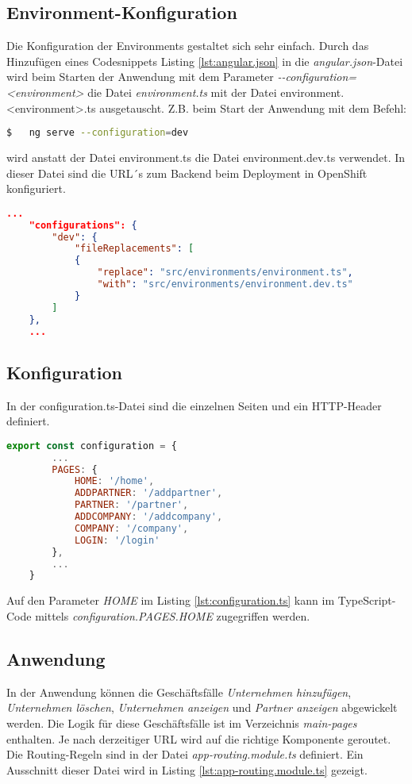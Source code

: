 \subsection{Environment-Konfiguration}
Die Konfiguration der Environments gestaltet sich sehr einfach. Durch das Hinzufügen eines Codesnippets Listing \ref{lst:angular.json} in die \textit{angular.json}-Datei wird beim Starten der Anwendung mit dem Parameter \textit{-{}-configuration=<environment>} die Datei \textit{environment.ts} mit der Datei environment.<environment>.ts ausgetauscht. Z.B. beim Start der Anwendung mit dem Befehl:
\begin{lstlisting}[language=bash]
$	ng serve --configuration=dev
\end{lstlisting}
 
wird anstatt der Datei environment.ts die Datei environment.dev.ts verwendet. In dieser Datei sind die URL´s zum Backend beim Deployment in OpenShift konfiguriert.

\begin{lstlisting}[language=json, caption={angular.json}, label={lst:angular.json}]
	...
	"configurations": {
		"dev": {
			"fileReplacements": [
			{
				"replace": "src/environments/environment.ts",
				"with": "src/environments/environment.dev.ts"
			}
		]
	},
	...
\end{lstlisting}

\subsection{Konfiguration}
In der configuration.ts-Datei sind die einzelnen Seiten und ein HTTP-Header definiert.

\begin{lstlisting}[language=JavaScript, caption={configuration.ts}, label={lst:configuration.ts}]
	export const configuration = {
		...
		PAGES: {
			HOME: '/home',
			ADDPARTNER: '/addpartner',
			PARTNER: '/partner',
			ADDCOMPANY: '/addcompany',
			COMPANY: '/company',
			LOGIN: '/login'
		},
		...
	}
\end{lstlisting}
Auf den Parameter \textit{HOME} im Listing \ref{lst:configuration.ts} kann im TypeScript-Code mittels \textit{configuration.PAGES.HOME} zugegriffen werden.

\subsection{Anwendung}
In der Anwendung können die Geschäftsfälle \textit{Unternehmen hinzufügen}, \textit{Unternehmen löschen}, \textit{Unternehmen anzeigen} und \textit{Partner anzeigen} abgewickelt werden. Die Logik für diese Geschäftsfälle ist im Verzeichnis \textit{main-pages} enthalten.
Je nach derzeitiger URL wird auf die richtige Komponente geroutet. Die Routing-Regeln sind in der Datei \textit{app-routing.module.ts} definiert. Ein Ausschnitt dieser Datei wird in Listing \ref{lst:app-routing.module.ts} gezeigt.

